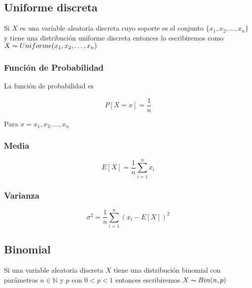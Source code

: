 \documentclass{article}
\begin{document}
                
        \subsection{Uniforme discreta}

                Si $X$ es una variable aleatoria discreta cuyo soporte es el conjunto $\{ x_1,x_2,\ldots , x_n \}$ y tiene una distribución uniforme discreta entonces lo escribiremos como $X\thicksim Uniforme (x_1,x_2,\ldots , x_n)$
                
            \subsubsection{Función de Probabilidad}

                La función de probabilidad es

                    \begin{equation*}
                        P[X=x] = \frac{1}{n}
                    \end{equation*}

                Para $x=x_1,x_2,\ldots , x_n$ 

            \subsubsection{Media}

                \begin{equation*}
                    E[X] = \frac{1}{n} \sum _{i=1}^n x_i
                \end{equation*}
                
            \subsubsection{Varianza}

                \begin{equation*}
                    \sigma ^2 = \frac{1}{n} \sum_{i=1}^n (x_i-E[X])^2
                \end{equation*}
            
        \subsection{Binomial}

            Si una variable aleatoria discreta $X$ tiene una distribución binomial con parámetros $n\in \mathbb{N}$ y $p$ con $0<p<1$ entonces escribiremos $X\thicksim Bin (n,p)$
\end{document}
